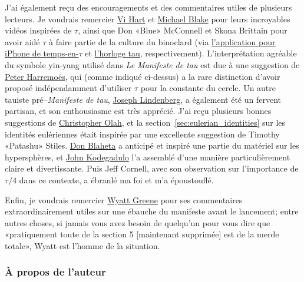 J'ai également reçu des encouragements et des commentaires utiles de plusieurs
lecteurs. Je voudrais remercier
\href{https://www.youtube.com/watch?v=jG7vhMMXagQ}{Vi Hart} et
\href{https://www.youtube.com/watch?v=3174T-3-59Q}{Michael Blake} pour leurs
incroyables vidéos inspirées de $\tau$, ainsi que Don «\ns Blue\ns » McConnell et
Skona Brittain pour avoir aidé $\tau$ à faire partie de la culture du binoclard
(via \href{http://tauclock.com/}{l'application pour iPhone de temps-en-$\tau$}
et \href{http://www.sbcrafts.net/clocks/}{l'horloge tau}, respectivement).
L'interprétation agréable du symbole yin-yang utilisé dans \emph{Le Manifeste de
tau} est due à une suggestion de \href{http://www.harremoes.dk/Peter/}{Peter
Harremoës}, qui (comme indiqué ci-dessus) a la rare distinction d'avoir proposé
indépendamment d'utiliser $\tau$ pour la constante du cercle. Un autre tauiste
pré--\emph{Manifeste de tau},
\href{https://sites.google.com/site/taubeforeitwascool/}{Joseph Lindenberg}, a
également été un fervent partisan, et son enthousiasme est très apprécié. J'ai
reçu plusieurs bonnes suggestions de
\href{https://christopherolah.wordpress.com/about-me}{Christopher Olah}, et la
section~\ref{sec:eulerian_identities} sur les identités eulériennes était
inspirée par une excellente suggestion de Timothy «\ns Patashu\ns » Stiles.
\href{http://www.blahedo.org/blog/archives/001083.html}{Don Blaheta} a anticipé
et inspiré une partie du matériel sur les hypersphères, et
\href{https://bit.ly/2WyHqmK}{John Kodegadulo} l'a assemblé d'une manière
particulièrement claire et divertissante. Puis Jeff Cornell, avec son
observation sur l'importance de $\tau/4$ dans ce contexte, a ébranlé ma foi et
m'a époustouflé.

Enfin, je voudrais remercier \href{https://techiferous.com/}{Wyatt Greene} pour
ses commentaires extraordinairement utiles sur une ébauche du manifeste avant le
lancement\ns; entre autres choses, si jamais vous avez besoin de quelqu'un pour
vous dire que «\ns pratiquement toute de la section 5 [maintenant supprimée] est
de la merde totale\ns », Wyatt est l'homme de la situation.



    \subsubsection{À propos de l'auteur} %
    \label{sec:about_the_author}


